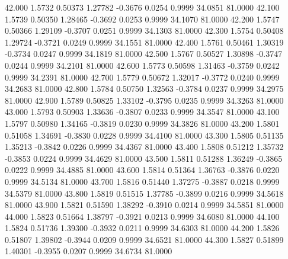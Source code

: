   42.000   1.5732   0.50373   1.27782  -0.3676   0.0254   0.9999  34.0851  81.0000
  42.100   1.5739   0.50350   1.28465  -0.3692   0.0253   0.9999  34.1070  81.0000
  42.200   1.5747   0.50366   1.29109  -0.3707   0.0251   0.9999  34.1303  81.0000
  42.300   1.5754   0.50408   1.29724  -0.3721   0.0249   0.9999  34.1551  81.0000
  42.400   1.5761   0.50461   1.30319  -0.3734   0.0247   0.9999  34.1819  81.0000
  42.500   1.5767   0.50527   1.30898  -0.3747   0.0244   0.9999  34.2101  81.0000
  42.600   1.5773   0.50598   1.31463  -0.3759   0.0242   0.9999  34.2391  81.0000
  42.700   1.5779   0.50672   1.32017  -0.3772   0.0240   0.9999  34.2683  81.0000
  42.800   1.5784   0.50750   1.32563  -0.3784   0.0237   0.9999  34.2975  81.0000
  42.900   1.5789   0.50825   1.33102  -0.3795   0.0235   0.9999  34.3263  81.0000
  43.000   1.5793   0.50903   1.33636  -0.3807   0.0233   0.9999  34.3547  81.0000
  43.100   1.5797   0.50980   1.34165  -0.3819   0.0230   0.9999  34.3826  81.0000
  43.200   1.5801   0.51058   1.34691  -0.3830   0.0228   0.9999  34.4100  81.0000
  43.300   1.5805   0.51135   1.35213  -0.3842   0.0226   0.9999  34.4367  81.0000
  43.400   1.5808   0.51212   1.35732  -0.3853   0.0224   0.9999  34.4629  81.0000
  43.500   1.5811   0.51288   1.36249  -0.3865   0.0222   0.9999  34.4885  81.0000
  43.600   1.5814   0.51364   1.36763  -0.3876   0.0220   0.9999  34.5134  81.0000
  43.700   1.5816   0.51440   1.37275  -0.3887   0.0218   0.9999  34.5379  81.0000
  43.800   1.5819   0.51515   1.37785  -0.3899   0.0216   0.9999  34.5618  81.0000
  43.900   1.5821   0.51590   1.38292  -0.3910   0.0214   0.9999  34.5851  81.0000
  44.000   1.5823   0.51664   1.38797  -0.3921   0.0213   0.9999  34.6080  81.0000
  44.100   1.5824   0.51736   1.39300  -0.3932   0.0211   0.9999  34.6303  81.0000
  44.200   1.5826   0.51807   1.39802  -0.3944   0.0209   0.9999  34.6521  81.0000
  44.300   1.5827   0.51899   1.40301  -0.3955   0.0207   0.9999  34.6734  81.0000

